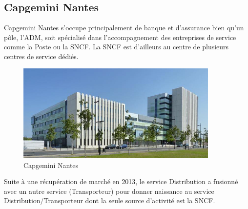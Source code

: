 \clearpage
\subsection{Capgemini Nantes}

Capgemini Nantes s'occupe principalement de banque et d'assurance bien qu'un pôle, l'ADM, soit spécialisé dans l'accompagnement des entreprises de service comme la Poste ou la SNCF. La SNCF est d'ailleurs au centre de plusieurs centres de service dédiés.

\begin{figure}[!h]
    \centering
        \includegraphics[width=10cm]{img/capgeminiNantes.png}
        \caption{Capgemini Nantes}
        \label{fig:capgeminiNantes}
\end{figure}

Suite à une récupération de marché en 2013, le service Distribution a fusionné avec un autre service (Transporteur) pour donner naissance au service Distribution/Transporteur dont la seule source d'activité est la SNCF.